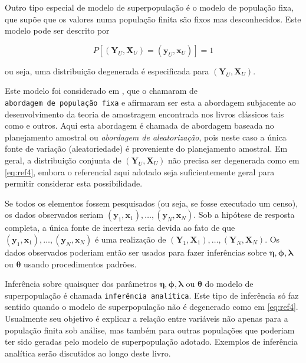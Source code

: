 \documentclass[]{book}
\numberwithin{example}{chapter}
\numberwithin{remark}{chapter}
\numberwithin{definition}{chapter}
\begin{document}
Outro tipo especial de modelo de superpopulação é o modelo de população
fixa, que supõe que os valores numa população finita são fixos mas
desconhecidos. Este modelo pode ser descrito por

\begin{equation}
P\left[ \left( \mathbf{Y}_U , \mathbf{X}_U \right) = \left( \mathbf{y}_U , \mathbf{x}_U \right) \right] = 1 \label{eq:ref4}
\end{equation}

ou seja, uma distribuição degenerada é especificada para
\(\left(\mathbf{Y}_U , \mathbf{X}_U \right)\).

Este modelo foi considerado em \citep{cassel}, que o chamaram de
\texttt{abordagem\ de\ população\ fixa} e afirmaram ser esta a abordagem
subjacente ao desenvolvimento da teoria de amostragem encontrada nos
livros clássicos tais como \citep{cochran} e outros. Aqui esta abordagem
é chamada de abordagem baseada no planejamento amostral ou
\emph{abordagem de aleatorização}, pois neste caso a única fonte de
variação (aleatoriedade) é proveniente do planejamento amostral. Em
geral, a distribuição conjunta de
\(\left( \mathbf{Y}_U , \mathbf{X}_U \right)\) não precisa ser
degenerada como em \eqref{eq:ref4}, embora o referencial aqui adotado seja
suficientemente geral para permitir considerar esta possibilidade.

Se todos os elementos fossem pesquisados (ou seja, se fosse executado um
censo), os dados observados seriam
\((\mathbf{y}_1 , \mathbf{x}_1) ,\ldots, (\mathbf{y}_N , \mathbf{x}_N)\).
Sob a hipótese de resposta completa, a única fonte de incerteza seria
devida ao fato de que
\((\mathbf{y}_1 , \mathbf{x}_1) ,\ldots, (\mathbf{y}_N , \mathbf{x}_N)\)
é uma realização de
\(\left( \mathbf{Y}_1 , \mathbf{X}_1 \right) ,\ldots, \left( \mathbf{Y}_N , \mathbf{X}_N \right)\).
Os dados observados poderiam então ser usados para fazer inferências
sobre \(\mathbf{\eta}, \mathbf{\phi},\mathbf{\lambda}\) ou
\(\mathbf{\theta}\) usando procedimentos padrões.

Inferência sobre quaisquer dos parâmetros
\(\mathbf{\eta},\mathbf{\phi},\mathbf{\lambda}\) ou \(\mathbf{\theta}\)
do modelo de superpopulação é chamada \texttt{inferência\ analítica}.
Este tipo de inferência só faz sentido quando o modelo de superpopulação
não é degenerado como em \eqref{eq:ref4}. Usualmente seu objetivo é
explicar a relação entre variáveis não apenas para a população finita
sob análise, mas também para outras populações que poderiam ter sido
geradas pelo modelo de superpopulação adotado. Exemplos de inferência
analítica serão discutidos ao longo deste livro.
\end{document}
